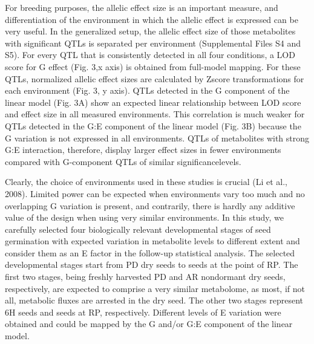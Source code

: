 For breeding purposes, the allelic effect size is an important measure, and differentiation of the 
environment in which the allelic effect is expressed can be very useful. In the generalized setup, 
the allelic effect size of those metabolites with significant QTLs is separated per environment 
(Supplemental Files S4 and S5). For every QTL that is consistently detected in all four conditions, 
a LOD score for G effect (Fig. 3,x axis) is obtained from full-model mapping. For these QTLs,
normalized allelic effect sizes are calculated by Zscore transformations for each environment 
(Fig. 3, y axis). QTLs detected in the G component of the linear model (Fig. 3A) show an expected 
linear relationship between LOD score and effect size in all measured environments. This correlation 
is much weaker for QTLs detected in the G:E component of the linear model (Fig. 3B) because the G 
variation is not expressed in all environments. QTLs of metabolites with strong G:E interaction, 
therefore, display larger effect sizes in fewer environments compared with G-component QTLs of 
similar significancelevels.

Clearly, the choice of environments used in these studies is crucial (Li et al., 2008). Limited power 
can be expected when environments vary too much and no overlapping G variation is present, and 
contrarily, there is hardly any additive value of the design when using very similar environments. 
In this study, we carefully selected four biologically relevant developmental stages of seed germination 
with expected variation in metabolite levels to different extent and consider them as an E factor in 
the follow-up statistical analysis. The selected developmental stages start from PD dry seeds to 
seeds at the point of RP. The first two stages, being freshly harvested PD and AR nondormant dry 
seeds, respectively, are expected to comprise a very similar metabolome, as most, if not all, metabolic
fluxes are arrested in the dry seed. The other two stages represent 6H seeds and seeds at RP, respectively.
Different levels of E variation were obtained and could be mapped by the G and/or G:E component of 
the linear model.

